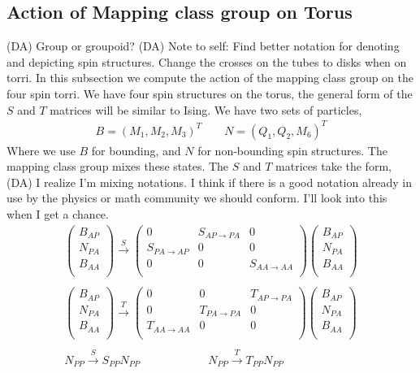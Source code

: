 \documentclass[12pt,a4paper]{article}
\newcounter{arrow}
\newcommand{\dave}[1]{{\color{ao(english)}\footnotesize{(DA) #1}}}
\begin{document}
\subsection{Action of Mapping class group on Torus }
\dave{Group or groupoid?}
\dave{Note to self: Find better notation for denoting and depicting spin structures. Change the crosses on the tubes to disks when on torri.}
In this subsection we compute the action of the mapping class group on the four spin torri. 
We have four spin structures on the torus, the general form of the $S$ and $T$ matrices will be similar to Ising. 
We have two sets of particles, 
\begin{align}
B = (M_1, M_2, M_3)^{T} \quad \quad N = (Q_1, Q_2, M_6)^{T}
\end{align}
Where we use $B$ for bounding, and $N$ for non-bounding spin structures.
The mapping class group mixes these states. 
The $S$ and $T$ matrices take the form,
\dave{I realize I'm mixing notations. I think if there is a good notation already in use by the physics or math community we should conform. I'll look into this when I get a chance.}
\begin{align}
\left(\begin{matrix}
B_{AP}\\
N_{PA} \\
B_{AA} \\
\end{matrix} \right)
\xrightarrow{S} \left( \begin{matrix}
0 & S_{AP \rightarrow PA} &0 \\
S_{PA \rightarrow AP} & 0 & 0 \\
0& 0 & S_{AA \rightarrow AA} \\
\end{matrix} \right)
\left(\begin{matrix}
B_{AP}\\
N_{PA} \\
B_{AA} \\
\end{matrix} \right)\\
\\
\left(\begin{matrix}
B_{AP}\\
N_{PA} \\
B_{AA} \\
\end{matrix} \right)
\xrightarrow{T} \left( \begin{matrix}
0 & 0 & T_{AP \rightarrow PA} \\
0 & T_{PA \rightarrow PA} & 0 \\
T_{AA \rightarrow AA} & 0 & 0 \\
\end{matrix} \right)
\left(\begin{matrix}
B_{AP}\\
N_{PA} \\
B_{AA} \\
\end{matrix} \right) \\
\\
N_{PP} \xrightarrow{S} S_{PP} N_{PP} \qquad\qquad\qquad  N_{PP} \xrightarrow{T} T_{PP} N_{PP} \\
\end{align}
\end{document}
